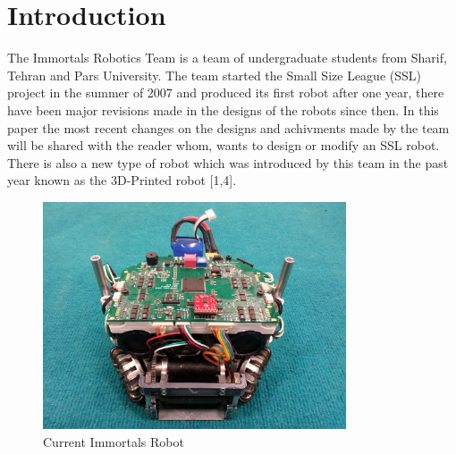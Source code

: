 \documentclass[runningheads,a4paper]{llncs}
\begin{document}
\section{Introduction}
The Immortals Robotics Team is a team of undergraduate students from Sharif, Tehran and Pars University. The team started the Small Size League (SSL) project in the summer of 2007 and produced its first robot after one year, there have been major revisions made in the designs of the robots since then. In this paper the most recent changes on the designs and achivments made by the team will be shared with the reader whom, wants to design or modify an SSL robot. There is also a new type of robot which was introduced by this team in the past year known as the 3D-Printed robot [1,4].
\begin{figure}
	\centering
	\includegraphics[width=0.8\textwidth]{images/CURRENT.jpg}
	\caption{Current Immortals Robot}
	\label{fig:CURRENT_ROBOT}
\end{figure}
\end{document}
